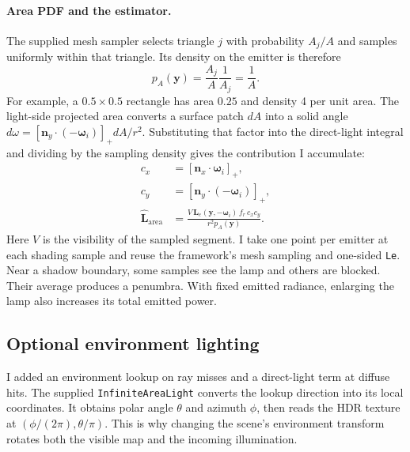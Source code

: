 \documentclass[acmtog]{acmart}
\begin{document}
\paragraph{Area PDF and the estimator.}
The supplied mesh sampler selects triangle $j$ with probability $A_j/A$ and samples uniformly within that triangle. Its density on the emitter is therefore
\begin{equation}
p_A(\mathbf y)=\frac{A_j}{A}\frac{1}{A_j}=\frac{1}{A}.
\end{equation}
For example, a $0.5\times0.5$ rectangle has area $0.25$ and density 4 per unit area. The light-side projected area converts a surface patch $dA$ into a solid angle $d\omega=[\mathbf n_y\cdot(-\boldsymbol\omega_i)]_+dA/r^2$. Substituting that factor into the direct-light integral and dividing by the sampling density gives the contribution I accumulate:
\begin{equation}
\begin{aligned}
c_x &= [\mathbf n_x\cdot\boldsymbol\omega_i]_+,\\
c_y &= [\mathbf n_y\cdot(-\boldsymbol\omega_i)]_+,\\
\widehat{\mathbf L}_{\mathrm{area}}
 &=\frac{V\,\mathbf L_e(\mathbf y,-\boldsymbol\omega_i)\,f_r\,c_xc_y}
         {r^2 p_A(\mathbf y)}.
\end{aligned}
\end{equation}
Here $V$ is the visibility of the sampled segment. I take one point per emitter at each shading sample and reuse the framework's mesh sampling and one-sided \texttt{Le}. Near a shadow boundary, some samples see the lamp and others are blocked. Their average produces a penumbra. With fixed emitted radiance, enlarging the lamp also increases its total emitted power.

\subsection{Optional environment lighting}
I added an environment lookup on ray misses and a direct-light term at diffuse hits. The supplied \texttt{InfiniteAreaLight} converts the lookup direction into its local coordinates. It obtains polar angle $\theta$ and azimuth $\phi$, then reads the HDR texture at $(\phi/(2\pi),\theta/\pi)$. This is why changing the scene's environment transform rotates both the visible map and the incoming illumination.
\end{document}
